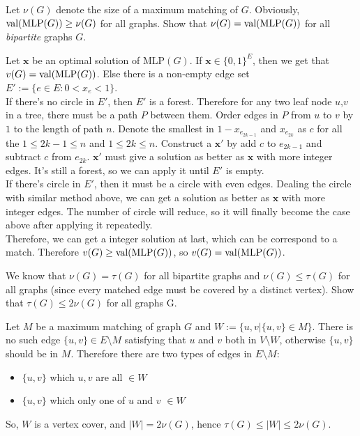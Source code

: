 \documentclass[11pt,a4paper,oneside]{article}
\newcommand{\val}{\textnormal{val}}
\begin{document}
\begin{problem}{1}
	\statement
   Let $\nu(G)$ denote the size of a maximum matching of $G$. 
   Obviously, $ \val(\textrm{MLP}(G)) \geq \nu(G)$ for all graphs.
   Show that
   $\nu(G) = \val(\textrm{MLP}(G))$ for all {\em bipartite} graphs $G$.
   
    \solution
    Let $\mathbf{x}$ be an optimal solution of $\mathrm{MLP}(G)$. If $\mathbf{x} \in \{0,1\}^E$, then we get that $v(G) = \val(\mathrm{MLP}(G))$. Else there is a non-empty edge set $E':=\{e \in E : 0 < x_e < 1\}$.\\
    If there's no circle in $E'$, then $E'$ is a forest. Therefore for any two leaf node $u$,$v$ in a tree, there must be a path $P$ between them. Order edges in $P$ from $u$ to $v$ by $1$ to the length of path $n$. Denote the smallest in $1-x_{e_{2k-1}}$ and $x_{e_{2k}}$ as $c$ for all the $1 \leq 2k - 1 \leq n$ and $1 \leq 2k \leq n$. Construct a $\mathbf{x'}$ by add $c$ to $e_{2k-1}$ and subtract $c$ from $e_{2k}$. $\mathbf{x'}$ must give a solution as better as $\mathbf{x}$ with more integer edges. It's still a forest, so we can apply it until $E'$ is empty.\\
    If there's circle in $E'$, then it must be a circle with even edges. Dealing the circle with similar method above, we can get a solution as better as $\mathbf{x}$ with more integer edges. The number of circle will reduce, so it will finally become the case above after applying it repeatedly.\\
    Therefore, we can get a integer solution at last, which can be correspond to a match. Therefore $v(G) \geq \val(\mathrm{MLP}(G))$, so $v(G) = \val(\mathrm{MLP}(G))$.
    
\end{problem}

\begin{problem}{2}
  \statement
 We know that $\nu(G) = \tau(G)$ for all bipartite graphs 
        and $\nu(G) \leq \tau(G)$ for all graphs (since every matched edge must
        be covered by a distinct vertex). Show that $\tau(G) \leq 2 \nu(G)$ for all graphs G.
  
  \solution
  
  Let \(M\) be a maximum matching of graph \(G\) and \(W := \{u, v | \{u, v\} \in M\}\). There is no such edge \(\{u, v\} \in E \setminus M\) satisfying that \(u\) and \(v\) both in \(V \setminus W\), otherwise \(\{u, v\}\) should be in \(M\). Therefore there are two types of edges in \(E \setminus M\):
  
  \begin{itemize}
  	\item \(\{u, v\}\) which \(u, v\) are all \(\in W\)
  	\item \(\{u, v\}\) which only one of \(u\) and \(v\) \(\in W\)
  \end{itemize}

	So, \(W\) is a vertex cover, and \(|W| = 2\nu(G)\), hence \(\tau(G) \leq |W| \leq 2\nu(G)\).
\end{problem}
\end{document}
